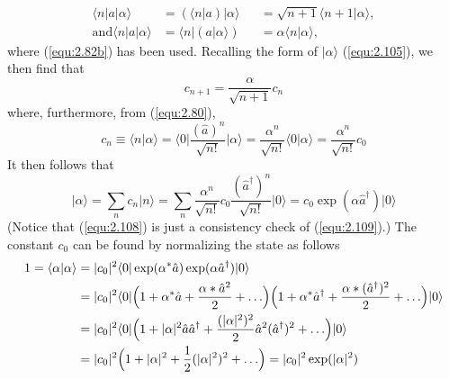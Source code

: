 \begin{subequations}
  \begin{alignat}{4}
    \langle n\vert a\vert \alpha\rangle  &= (\langle n\vert a)\vert \alpha\rangle  &&=
    \sqrt{n+1}\langle n+1\vert \alpha\rangle , \label{equ:2.107a}\\
    \text{and} \langle n\vert a\vert \alpha\rangle  &= \langle n\vert (a\vert \alpha\rangle ) &&= \alpha
    \langle n\vert \alpha\rangle , \label{equ:2.107b}
  \end{alignat}
\end{subequations}
where (\ref{equ:2.82b}) has been used. Recalling the form of
$\vert \alpha\rangle $ (\ref{equ:2.105}), we then find that
\begin{equation}
  c_{n+1} = \frac{\alpha}{\sqrt{n+1}}c_n
  \label{equ:2.108}
\end{equation}
where, furthermore, from (\ref{equ:2.80}),
\begin{equation}
  c_n \equiv \langle n\vert \alpha\rangle  =
  \langle 0\vert \frac{(\hat{a})^n}{\sqrt{n!}}\vert \alpha\rangle  =
  \frac{\alpha^n}{\sqrt{n!}} \langle 0\vert \alpha\rangle  =
  \frac{\alpha^n}{\sqrt{n!}}c_0
  \label{equ:2.109}
\end{equation}
It then follows that
\begin{equation}
  \vert \alpha\rangle  = \sum_n c_n \vert n\rangle  = \sum_n
  \frac{\alpha^n}{\sqrt{n!}}c_0
  \frac{(\hat{a}^{\dagger})^n}{\sqrt{n!}} \vert 0\rangle  = c_0
  \exp(\alpha \hat{a}^{\dagger}) \vert 0\rangle 
  \label{equ:2.110}
\end{equation}
(Notice that (\ref{equ:2.108}) is just a consistency check
of (\ref{equ:2.109}).) The constant $c_0$ can be found by
normalizing the state as follows
  \begin{alignat}{2}
    1 = \langle \alpha\vert \alpha\rangle  &= \vert c_0\vert ^2
    \langle 0\vert \exp(\alpha^*\hat{a})\exp(\alpha\hat{a}^{\dagger})\vert 0\rangle 
    \nonumber\\
    &= \vert c_0\vert ^2 \langle 0\vert 
    \Bigl(
      1+\alpha^*\hat{a} + \frac{\alpha*\hat{a}^2}{2} +
      \ldots
    \Bigr)
    \Bigl(
    1+\alpha^*\hat{a}^{\dagger} + \frac{\alpha*(\hat{a}^{\dagger})^2}{2} +
      \ldots
    \Bigr)\vert 0\rangle \nonumber\\
    &=
    \vert c_0\vert ^2\langle 0\vert 
    \Bigl(
      1+\vert \alpha\vert ^2\hat{a}\hat{a}^{\dagger} +
      \frac{(\vert \alpha\vert ^2)^2}{2}\hat{a}^2(\hat{a}^{\dagger})^2
      + \ldots
    \Bigr)\vert 0\rangle \nonumber\\
    &=\vert c_0\vert ^2
    \Bigl(
    1+\vert \alpha\vert ^2 + \frac{1}{2}(\vert \alpha\vert ^2)^2 + \ldots
    \Bigr) = \vert c_0\vert ^2 \exp(\vert \alpha\vert ^2) \label{equ:2.111}
  \end{alignat}
